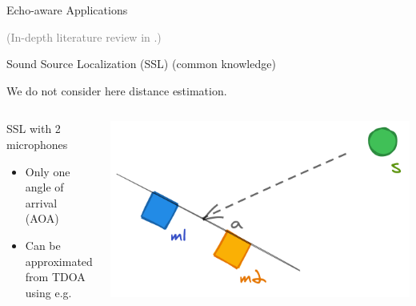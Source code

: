 \begin{frame}[t]{Echo-aware Applications \hfill\faBook}
    \pause[5]
    \vspace{-3mm}
    \begin{center}
        \textcolor{gray}{\small (In-depth literature review in \faBook.)}
    \end{center}
\end{frame}

\begin{frame}{Sound Source Localization (SSL) {\hfill\small (common knowledge)} \faBook}

    \faAlert We do not consider here distance estimation.

    \begin{columns}[T,onlytextwidth]
        \begin{block}{SSL with 2 microphones}
            \begin{itemize}
                \item Only one angle of arrival (\alert{AOA})\iconAOA
                \item Can be approximated from \alert{TDOA} using e.g. \GCCPHAT\footnotemark[1]
                \\\footnotemark[2]
            \end{itemize}
        \end{block}
        \includegraphics[width=\textwidth]{figures/1d_ssl.png}
    \end{columns}
    \pause


\end{frame}
